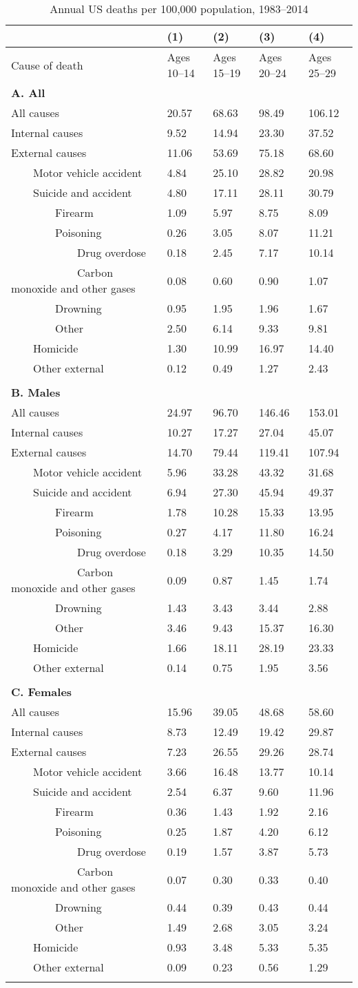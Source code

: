 \documentclass{article}
\begin{document}
\begin{table}[tbp] \centering
{}

\caption{Annual US deaths per 100,000 population, 1983--2014}
\label{tab:appendix_data_mortality}
{\small
\begin{tabularx}{\linewidth}{lCCCC}

\toprule
&{(1)}&{(2)}&{(3)}&{(4)} \tabularnewline \midrule
{Cause of death}&{Ages 10--14}&{Ages 15--19}&{Ages 20--24}&{Ages 25--29} \tabularnewline
\midrule \addlinespace[\belowrulesep]
\textbf{A. All}&&&& \tabularnewline
\midrule All causes&20.57&68.63&98.49&106.12 \tabularnewline
Internal causes&9.52&14.94&23.30&37.52 \tabularnewline
External causes&11.06&53.69&75.18&68.60 \tabularnewline
\ \ \ \ Motor vehicle accident&4.84&25.10&28.82&20.98 \tabularnewline
\ \ \ \ Suicide and accident&4.80&17.11&28.11&30.79 \tabularnewline
\ \ \ \ \ \ \ \ Firearm&1.09&5.97&8.75&8.09 \tabularnewline
\ \ \ \ \ \ \ \ Poisoning&0.26&3.05&8.07&11.21 \tabularnewline
\ \ \ \ \ \ \ \ \ \ \ \ Drug overdose&0.18&2.45&7.17&10.14 \tabularnewline
\ \ \ \ \ \ \ \ \ \ \ \ Carbon monoxide and other gases&0.08&0.60&0.90&1.07 \tabularnewline
\ \ \ \ \ \ \ \ Drowning&0.95&1.95&1.96&1.67 \tabularnewline
\ \ \ \ \ \ \ \ Other&2.50&6.14&9.33&9.81 \tabularnewline
\ \ \ \ Homicide&1.30&10.99&16.97&14.40 \tabularnewline
\ \ \ \ Other external&0.12&0.49&1.27&2.43 \tabularnewline
&&&& \tabularnewline
\textbf{B. Males}&&&& \tabularnewline
\midrule All causes&24.97&96.70&146.46&153.01 \tabularnewline
Internal causes&10.27&17.27&27.04&45.07 \tabularnewline
External causes&14.70&79.44&119.41&107.94 \tabularnewline
\ \ \ \ Motor vehicle accident&5.96&33.28&43.32&31.68 \tabularnewline
\ \ \ \ Suicide and accident&6.94&27.30&45.94&49.37 \tabularnewline
\ \ \ \ \ \ \ \ Firearm&1.78&10.28&15.33&13.95 \tabularnewline
\ \ \ \ \ \ \ \ Poisoning&0.27&4.17&11.80&16.24 \tabularnewline
\ \ \ \ \ \ \ \ \ \ \ \ Drug overdose&0.18&3.29&10.35&14.50 \tabularnewline
\ \ \ \ \ \ \ \ \ \ \ \ Carbon monoxide and other gases&0.09&0.87&1.45&1.74 \tabularnewline
\ \ \ \ \ \ \ \ Drowning&1.43&3.43&3.44&2.88 \tabularnewline
\ \ \ \ \ \ \ \ Other&3.46&9.43&15.37&16.30 \tabularnewline
\ \ \ \ Homicide&1.66&18.11&28.19&23.33 \tabularnewline
\ \ \ \ Other external&0.14&0.75&1.95&3.56 \tabularnewline
&&&& \tabularnewline
\textbf{C. Females}&&&& \tabularnewline
\midrule All causes&15.96&39.05&48.68&58.60 \tabularnewline
Internal causes&8.73&12.49&19.42&29.87 \tabularnewline
External causes&7.23&26.55&29.26&28.74 \tabularnewline
\ \ \ \ Motor vehicle accident&3.66&16.48&13.77&10.14 \tabularnewline
\ \ \ \ Suicide and accident&2.54&6.37&9.60&11.96 \tabularnewline
\ \ \ \ \ \ \ \ Firearm&0.36&1.43&1.92&2.16 \tabularnewline
\ \ \ \ \ \ \ \ Poisoning&0.25&1.87&4.20&6.12 \tabularnewline
\ \ \ \ \ \ \ \ \ \ \ \ Drug overdose&0.19&1.57&3.87&5.73 \tabularnewline
\ \ \ \ \ \ \ \ \ \ \ \ Carbon monoxide and other gases&0.07&0.30&0.33&0.40 \tabularnewline
\ \ \ \ \ \ \ \ Drowning&0.44&0.39&0.43&0.44 \tabularnewline
\ \ \ \ \ \ \ \ Other&1.49&2.68&3.05&3.24 \tabularnewline
\ \ \ \ Homicide&0.93&3.48&5.33&5.35 \tabularnewline
\ \ \ \ Other external&0.09&0.23&0.56&1.29 \tabularnewline
\bottomrule \addlinespace[\belowrulesep]


\end{tabularx}}
\end{table}
\end{document}
